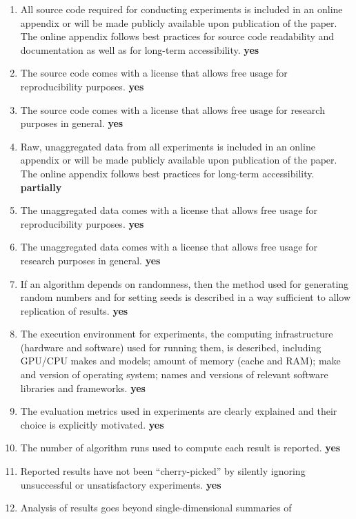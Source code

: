 \documentclass[manuscript, screen, review]{jair}
\theoremstyle{remark}
\begin{document}
\begin{enumerate}
    \item All source code required for conducting experiments is included in an
    online appendix or will be made publicly available upon publication of the
    paper. The online appendix follows best practices for source code
    readability and documentation as well as for long-term accessibility.
    \textbf{yes}
    \item The source code comes with a license that allows free usage for
    reproducibility purposes. \textbf{yes}
    \item The source code comes with a license that allows free usage for
    research purposes in general. \textbf{yes}
    \item Raw, unaggregated data from all experiments is included in an online
    appendix or will be made publicly available upon publication of the paper.
    The online appendix follows best practices for long-term accessibility.
    \textbf{partially}
    \item The unaggregated data comes with a license that allows free usage for
    reproducibility purposes. \textbf{yes}
    \item The unaggregated data comes with a license that allows free usage for
    research purposes in general. \textbf{yes}
    \item If an algorithm depends on randomness, then the method used for
    generating random numbers and for setting seeds is described in a way
    sufficient to allow replication of results. \textbf{yes}
    \item The execution environment for experiments, the computing
    infrastructure (hardware and software) used for running them, is described,
    including GPU/CPU makes and models; amount of memory (cache and RAM); make
    and version of operating system; names and versions of relevant software
    libraries and frameworks. \textbf{yes}
    \item The evaluation metrics used in experiments are clearly explained and
    their choice is explicitly motivated. \textbf{yes}
    \item The number of algorithm runs used to compute each result is reported.
    \textbf{yes}
    \item Reported results have not been ``cherry-picked'' by silently ignoring
    unsuccessful or unsatisfactory experiments. \textbf{yes}
    \item Analysis of results goes beyond single-dimensional summaries of

\end{enumerate}
\end{document}
